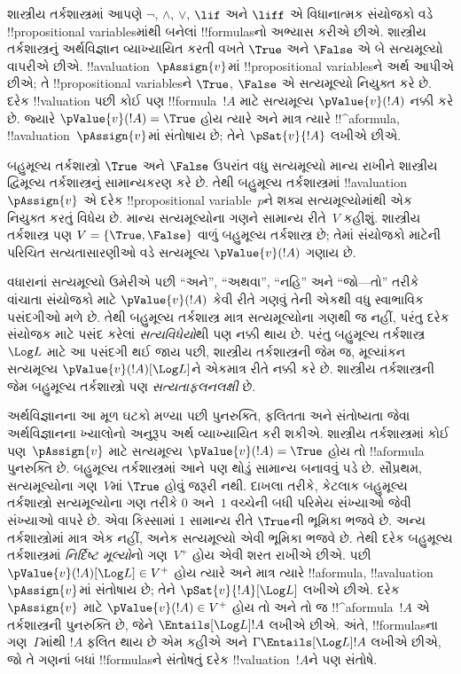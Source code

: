 \documentclass[../../../include/open-logic-section]{subfiles}
\begin{document}


શાસ્ત્રીય તર્કશાસ્ત્રમાં આપણે $\lnot$, $\land$, $\lor$,
$\lif$ અને $\liff$ એ વિધાનાત્મક સંયોજકો વડે
!!{propositional variable}sમાંથી બનેલાં !!{formula}sનો
અભ્યાસ કરીએ છીએ. શાસ્ત્રીય તર્કશાસ્ત્રનું અર્થવિજ્ઞાન
વ્યાખ્યાયિત કરતી વખતે $\True$ અને $\False$ એ બે
સત્યમૂલ્યો વાપરીએ છીએ. !!a{valuation}~$\pAssign{v}$માં
!!{propositional variable}sને અર્થ આપીએ છીએ; તે
!!{propositional variable}sને $\True$, $\False$ એ
સત્યમૂલ્યો નિયુક્ત કરે છે. દરેક !!{valuation} પછી
કોઈ પણ !!{formula}~$!A$ માટે સત્યમૂલ્ય
$\pValue{v}(!A)$ નક્કી કરે છે. જ્યારે
$\pValue{v}(!A) = \True$ હોય ત્યારે અને માત્ર
ત્યારે !!^a{formula}, !!a{valuation}~$\pAssign{v}$માં
સંતોષાય છે; તેને $\pSat{v}{!A}$ લખીએ છીએ.

બહુમૂલ્ય તર્કશાસ્ત્રો $\True$ અને $\False$ ઉપરાંત
વધુ સત્યમૂલ્યો માન્ય રાખીને શાસ્ત્રીય દ્વિમૂલ્ય
તર્કશાસ્ત્રનું સામાન્યકરણ કરે છે. તેથી બહુમૂલ્ય
તર્કશાસ્ત્રમાં !!a{valuation}~$\pAssign{v}$ એ
દરેક !!{propositional variable}~$p$ને શક્ય
સત્યમૂલ્યોમાંથી એક નિયુક્ત કરતું વિધેય છે. માન્ય
સત્યમૂલ્યોના ગણને સામાન્ય રીતે~$V$ કહીશું.
શાસ્ત્રીય તર્કશાસ્ત્ર પણ $V = \{\True, \False\}$
વાળું બહુમૂલ્ય તર્કશાસ્ત્ર છે; તેમાં સંયોજકો માટેની
પરિચિત સત્યતાસારણીઓ વડે સત્યમૂલ્ય
$\pValue{v}(!A)$ ગણાય છે.

વધારાનાં સત્યમૂલ્યો ઉમેરીએ પછી ``અને'', ``અથવા'',
``નહિ'' અને ``જો---તો'' તરીકે વાંચાતા સંયોજકો માટે
$\pValue{v}(!A)$ કેવી રીતે ગણવું તેની એકથી વધુ
સ્વાભાવિક પસંદગીઓ મળે છે. તેથી બહુમૂલ્ય તર્કશાસ્ત્ર
માત્ર સત્યમૂલ્યોના ગણથી જ નહીં, પરંતુ દરેક
સંયોજક માટે પસંદ કરેલાં \emph{સત્યવિધેયો}થી પણ
નક્કી થાય છે. પરંતુ બહુમૂલ્ય તર્કશાસ્ત્ર~$\Log L$
માટે આ પસંદગી થઈ જાય પછી, શાસ્ત્રીય તર્કશાસ્ત્રની
જેમ જ, મૂલ્યાંકન સત્યમૂલ્ય
$\pValue{v}(!A)[\Log L]$ને એકમાત્ર રીતે નક્કી કરે
છે. શાસ્ત્રીય તર્કશાસ્ત્રની જેમ બહુમૂલ્ય તર્કશાસ્ત્રો
પણ \emph{સત્યતાફલનલક્ષી} છે.

અર્થવિજ્ઞાનના આ મૂળ ઘટકો મળ્યા પછી પુનરુક્તિ,
ફલિતતા અને સંતોષ્યતા જેવા અર્થવિજ્ઞાનના ખ્યાલોનો
અનુરૂપ અર્થ વ્યાખ્યાયિત કરી શકીએ. શાસ્ત્રીય
તર્કશાસ્ત્રમાં કોઈ પણ~$\pAssign{v}$ માટે સત્યમૂલ્ય
$\pValue{v}(!A) = \True$ હોય તો !!a{formula}
પુનરુક્તિ છે. બહુમૂલ્ય તર્કશાસ્ત્રમાં આને પણ થોડું
સામાન્ય બનાવવું પડે છે. સૌપ્રથમ, સત્યમૂલ્યોના
ગણ~$V$માં $\True$ હોવું જરૂરી નથી. દાખલા તરીકે,
કેટલાક બહુમૂલ્ય તર્કશાસ્ત્રો સત્યમૂલ્યોના ગણ તરીકે
$0$ અને~$1$ વચ્ચેની બધી પરિમેય સંખ્યાઓ જેવી
સંખ્યાઓ વાપરે છે. એવા કિસ્સામાં $1$ સામાન્ય રીતે
$\True$ની ભૂમિકા ભજવે છે. અન્ય તર્કશાસ્ત્રોમાં
માત્ર એક નહીં, અનેક સત્યમૂલ્યો એવી ભૂમિકા
ભજવે છે. તેથી દરેક બહુમૂલ્ય તર્કશાસ્ત્રમાં
\emph{નિર્દિષ્ટ મૂલ્યો}નો ગણ~$V^+$ હોય એવી શરત
રાખીએ છીએ. પછી $\pValue{v}(!A)[\Log L] \in V^+$
હોય ત્યારે અને માત્ર ત્યારે !!a{formula},
!!a{valuation}~$\pAssign{v}$માં સંતોષાય છે;
તેને $\pSat{v}{!A}[\Log L]$ લખીએ છીએ.
દરેક~$\pAssign{v}$ માટે $\pValue{v}(!A) \in
V^+$ હોય તો અને તો જ !!^a{formula}~$!A$ એ
તર્કશાસ્ત્રની પુનરુક્તિ છે, જેને $\Entails[\Log L]
!A$ લખીએ છીએ. અંતે, !!{formula}sના ગણ~$\Gamma$માંથી
$!A$ ફલિત થાય છે એમ કહીએ અને $\Gamma
\Entails[\Log L] !A$ લખીએ છીએ, જો
તે ગણનાં બધાં !!{formula}sને સંતોષતું દરેક
!!{valuation}~$!A$ને પણ સંતોષે.
\end{document}
